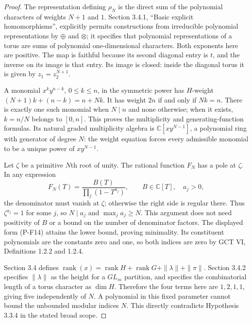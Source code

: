 \documentclass[11pt,a4paper]{article}
\begin{document}
\begin{proof}
The representation defining $\rho_N$ is the direct sum of the
polynomial characters of weights $N+1$ and $1$. Section 3.4.1,
``Basic explicit homomorphisms'', explicitly permits constructions
from irreducible polynomial representations by $\oplus$ and $\otimes$;
it specifies that polynomial representations of a torus are sums
of polynomial one-dimensional characters. Both exponents here are
positive. The map is faithful because its second diagonal entry is
$t$, and the inverse on its image is that entry. Its image is closed:
inside the diagonal torus it is given by $z_1=z_2^{N+1}$.

A monomial $x^k y^{n-k}$, $0\le k\le n$, in the symmetric power
has $H$-weight $(N+1)k+(n-k)=n+Nk$. It has weight $2n$ if and only
if $Nk=n$. There is exactly one such monomial when $N\mid n$ and
none otherwise; when it exists, $k=n/N$ belongs to $[0,n]$.
This proves the multiplicity and generating-function formulas.
Its natural graded multiplicity algebra is
$\mathbb C[xy^{N-1}]$, a polynomial ring with generator of degree $N$:
the weight equation forces every admissible monomial to be a unique
power of $xy^{N-1}$.

Let $\zeta$ be a primitive $N$th root of unity. The rational function
$F_N$ has a pole at $\zeta$. In any expression
\[
 F_N(T)=\frac{B(T)}{\prod_j(1-T^{a_j})},
 \qquad B\in\mathbb C[T],\quad a_j>0,
\]
the denominator must vanish at $\zeta$; otherwise the right side is
regular there. Thus $\zeta^{a_j}=1$ for some $j$, so $N\mid a_j$
and $\max_j a_j\ge N$. This argument does not need positivity of
$B$ or a bound on the number of denominator factors. The displayed
form (P-F14) attains the lower bound, proving minimality. Its
constituent polynomials are the constants zero and one, so both
indices are zero by GCT VI, Definitions 1.2.2 and 1.2.4.

Section 3.4 defines
$\operatorname{rank}(x)=\operatorname{rank}H+\operatorname{rank}G+
\|\lambda\|+\|\pi\|$.
Section 3.4.2 specifies $\|\lambda\|$ as the height for a
$GL_m$ partition, and specifies the combinatorial length of a torus
character as $\dim H$. Therefore the four terms here are
$1,2,1,1$, giving five independently of $N$. A polynomial in this
fixed parameter cannot bound the unbounded modular indices $N$.
This directly contradicts Hypothesis 3.3.4 in the stated broad scope.
\end{proof}
\end{document}

